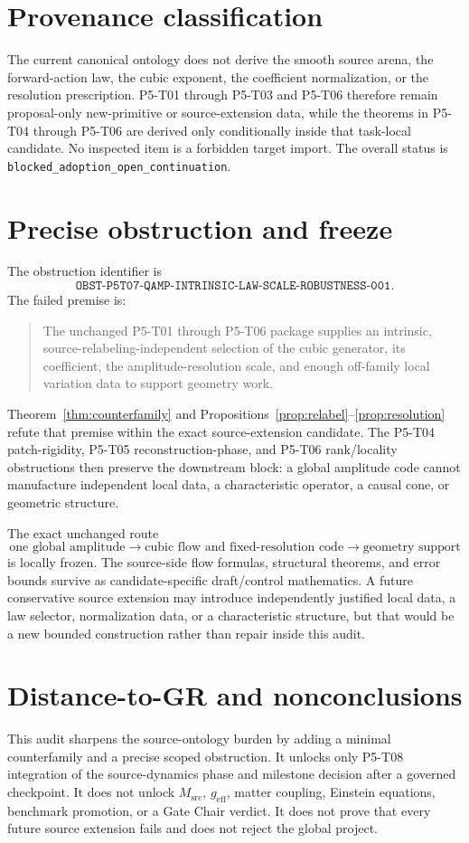 \documentclass[11pt]{article}
\begin{document}
\section{Provenance classification}

The current canonical ontology does not derive the smooth source arena, the
forward-action law, the cubic exponent, the coefficient normalization, or the
resolution prescription.  P5-T01 through P5-T03 and P5-T06 therefore remain
proposal-only new-primitive or source-extension data, while the theorems in
P5-T04 through P5-T06 are derived only conditionally inside that task-local
candidate.  No inspected item is a forbidden target import.  The overall
status is \texttt{blocked\_adoption\_open\_continuation}.

\section{Precise obstruction and freeze}

The obstruction identifier is
\[
 \texttt{OBST-P5T07-QAMP-INTRINSIC-LAW-SCALE-ROBUSTNESS-001}.
\]
The failed premise is:

\begin{quote}
The unchanged P5-T01 through P5-T06 package supplies an intrinsic,
source-relabeling-independent selection of the cubic generator, its
coefficient, the amplitude-resolution scale, and enough off-family local
variation data to support geometry work.
\end{quote}

Theorem~\ref{thm:counterfamily} and
Propositions~\ref{prop:relabel}--\ref{prop:resolution} refute that premise
within the exact source-extension candidate.  The P5-T04 patch-rigidity,
P5-T05 reconstruction-phase, and P5-T06 rank/locality obstructions then
preserve the downstream block: a global amplitude code cannot manufacture
independent local data, a characteristic operator, a causal cone, or
geometric structure.

The exact unchanged route
\[
 \text{one global amplitude}
 \longrightarrow
 \text{cubic flow and fixed-resolution code}
 \longrightarrow
 \text{geometry support}
\]
is locally frozen.  The source-side flow formulas, structural theorems, and
error bounds survive as candidate-specific draft/control mathematics.  A
future conservative source extension may introduce independently justified
local data, a law selector, normalization data, or a characteristic
structure, but that would be a new bounded construction rather than repair
inside this audit.

\section*{Distance-to-GR and nonconclusions}

This audit sharpens the source-ontology burden by adding a minimal
counterfamily and a precise scoped obstruction.  It unlocks only P5-T08
integration of the source-dynamics phase and milestone decision after a
governed checkpoint.  It does not unlock \(M_{\mathrm{src}}\),
\(g_{\mathrm{eff}}\), matter coupling, Einstein equations, benchmark
promotion, or a Gate Chair verdict.  It does not prove that every future
source extension fails and does not reject the global project.
\end{document}

